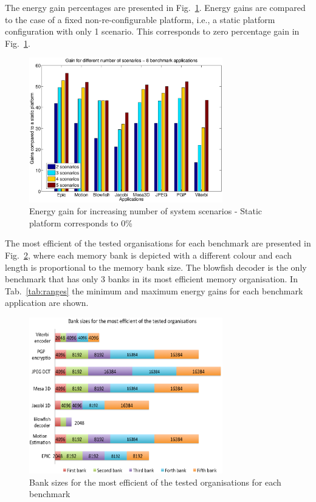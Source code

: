\documentclass[smallcondensed]{svjour3}
\begin{document}
The energy gain percentages are presented in Fig.~\ref{fig:gains}. 
Energy gains are compared to the case of a fixed non-re-configurable platform, i.e., a static platform configuration with only 1 scenario. 
This corresponds to zero percentage gain in Fig.~\ref{fig:gains}. 


\begin{figure}
\centering
\includegraphics[width=0.75\textwidth]{Images/6appsGains.eps}
\caption{Energy gain for increasing number of system scenarios - Static platform corresponds to 0\%}
\label{fig:gains}
\end{figure}

The most efficient of the tested organisations for each benchmark are presented in Fig.~\ref{fig:banks}, where each memory bank is depicted with a different colour and each length is proportional to the memory bank size. 
The blowfish decoder is the only benchmark that has only 3 banks in its most efficient memory organisation. 
In Tab.~\ref{tab:ranges} the minimum and maximum energy gains for each benchmark application are shown. 

\begin{figure}
\centering
\includegraphics[width=0.75\textwidth]{Images/banks2.eps}
\caption{Bank sizes for the most efficient of the tested organisations for each benchmark}
\label{fig:banks}
\end{figure}
\end{document}
